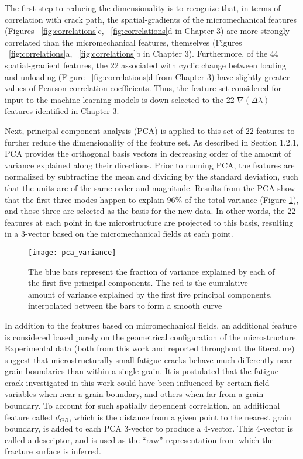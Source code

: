 The first step to reducing the dimensionality is to recognize that, in terms of correlation with crack path, the spatial-gradients of the micromechanical features (Figures ~\ref{fig:correlations}c, ~\ref{fig:correlations}d in Chapter 3) are more strongly correlated than the micromechanical features, themselves (Figures ~\ref{fig:correlations}a, ~\ref{fig:correlations}b in Chapter 3).  Furthermore, of the 44 spatial-gradient features, the 22 associated with cyclic change between loading and unloading (Figure ~\ref{fig:correlations}d from Chapter 3) have slightly greater values of Pearson correlation coefficients. Thus, the feature set considered for input to the machine-learning models is down-selected to the 22 $\nabla (\Delta \lambda)$ features identified in Chapter 3.

Next, principal component analysis (PCA) is applied to this set of 22 features to further reduce the dimensionality of the feature set.  As described in Section 1.2.1, PCA provides the orthogonal basis vectors in decreasing order of the amount of variance explained along their directions.  Prior to running PCA, the features are normalized by subtracting the mean and dividing by the standard deviation, such that the units are of the same order and magnitude.  Results from the PCA show that the first three modes happen to explain $96\%$ of the total variance (Figure \ref{fig:pca_variance}), and those three are selected as the basis for the new data.  In other words, the 22 features at each point in the microstructure are projected to this basis, resulting in a 3-vector based on the micromechanical fields at each point.

\begin{figure}[t]
  \centering
    \texttt{[image: pca\_variance]}
    \caption{The blue bars represent the fraction of variance explained by each of the first five principal components. The red is the cumulative amount of variance explained by the first five principal components, interpolated between the bars to form a smooth curve}
  \label{fig:pca_variance}
\end{figure}

In addition to the features based on micromechanical fields, an additional feature is considered based purely on the geometrical configuration of the microstructure.  Experimental data (both from this work and reported throughout the literature) suggest that microstructurally small fatigue-cracks behave much differently near grain boundaries than within a single grain.  It is postulated that the fatigue-crack investigated in this work could have been influenced by certain field variables when near a grain boundary, and others when far from a grain boundary.  To account for such spatially dependent correlation, an additional feature called $d_{GB}$, which is the distance from a given point to the nearest grain boundary, is added to each PCA 3-vector to produce a 4-vector.  This 4-vector is called a descriptor, and is used as the ``raw'' representation from which the fracture surface is inferred.

